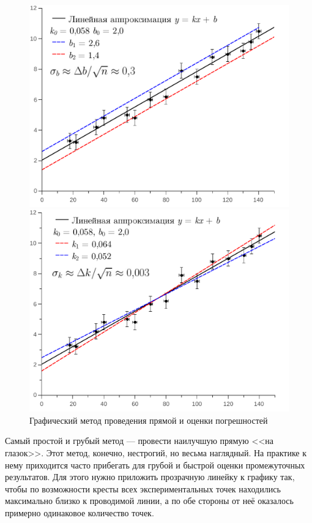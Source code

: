 \begin{figure}[th]
\begin{minipage}[t]{0.5\columnwidth}%
\includegraphics[width=1\linewidth]{images/График1.pdf}%
\end{minipage}%
\begin{minipage}[t]{0.5\columnwidth}%
\includegraphics[width=1\linewidth]{images/График2.pdf}%
\end{minipage}

\caption{Графический метод проведения прямой и оценки погрешностей}
\end{figure}

Самый простой и грубый метод --- провести наилучшую прямую
<<на глазок>>. Этот метод, конечно, нестрогий,
но весьма наглядный. На практике к нему приходится часто прибегать
для грубой и быстрой оценки промежуточных результатов. Для этого нужно
приложить прозрачную линейку к графику так, чтобы по возможности кресты
всех экспериментальных точек находились максимально близко к проводимой
линии, а по обе стороны от неё оказалось примерно одинаковое количество
точек. 

